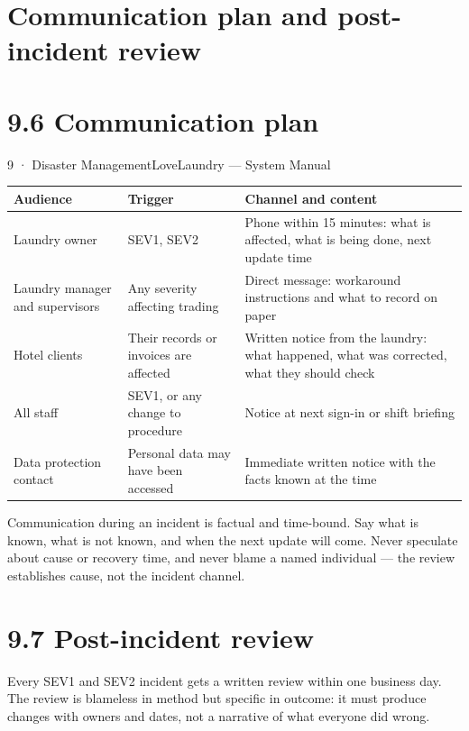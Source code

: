 \documentclass[11pt,a4paper,oneside]{book}
\begin{document}
\section*{Communication plan and post-incident review}
\section{9.6 Communication plan}
9 · Disaster ManagementLoveLaundry — System Manual

\begin{center}\small
\begin{tabularx}{\linewidth}{|X|X|X|}
\hline
\rowcolor{lightgrey}
\textbf{Audience} & \textbf{Trigger} & \textbf{Channel and content} \\ \hline
Laundry owner & SEV1, SEV2 & Phone within 15 minutes: what is affected, what is being done, next update time \\ \hline
Laundry manager and supervisors & Any severity affecting trading & Direct message: workaround instructions and what to record on paper \\ \hline
Hotel clients & Their records or invoices are affected & Written notice from the laundry: what happened, what was corrected, what they should check \\ \hline
All staff & SEV1, or any change to procedure & Notice at next sign-in or shift briefing \\ \hline
Data protection contact & Personal data may have been accessed & Immediate written notice with the facts known at the time \\ \hline
\end{tabularx}
\end{center}
Communication during an incident is factual and time-bound. Say what is known, what is not known, and when the next update will come. Never speculate about cause or recovery time, and never blame a named individual — the review establishes cause, not the incident channel.

\section{9.7 Post-incident review}
Every SEV1 and SEV2 incident gets a written review within one business day. The review is blameless in method but specific in outcome: it must produce changes with owners and dates, not a narrative of what everyone did wrong.
\end{document}
